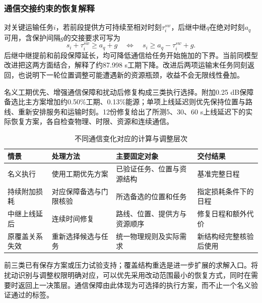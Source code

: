 \subsubsection{通信交接约束的恢复解释}
对关键运输任务$i$，若前段提供方可持续至相对时刻$\tau_i^{sw}$，后继中继$q$在绝对时刻$a_q$可用，含保护间隔$g$的交接要求可写为
\begin{equation}
 s_i+\tau_i^{sw}\ge a_q+g
 \quad\Longleftrightarrow\quad
 s_i\ge a_q-\tau_i^{sw}+g.
 \label{eq:q3_handoff_start}
\end{equation}
后继中继提前和前段保障延长，均可降低通信给任务开始施加的下界。当前同模型改进把这两方面结合，解释了约87.998 s工期下降。改进后两项运输末任务同刻返回，也说明下一轮位置调整可能遭遇新的资源瓶颈，收益不会无限线性叠加。

名义工期优先、增强通信保障和扰动后修复构成三类执行选择。附加0.25 dB保障备选比主方案增加约0.50\%工期、0.13\%能源；单项上线延迟则优先保持位置与路线、重新安排服务和运输时刻。12份修复给出了所测5、30、60 s上线延迟下的实际恢复方案，各自检查物理、时限、资源和连续通信。

\begin{table}[htbp]\centering\small
\caption{不同通信变化对应的计算与调整层次}\label{tab:q3_recovery_policy}
\begin{tabularx}{\linewidth}{p{2.3cm}LLL}\toprule
情景 & 处理方法 & 主要固定对象 & 交付结果\\\midrule
名义执行 & 使用工期优先方案 & 已验证任务、位置与资源结构 & 基准完整日程\\
持续附加损耗 & 对应保障备选与门限核验 & 所选备选的位置和任务 & 指定损耗条件下的日程\\
中继上线延后 & 连续时间修复 & 路线、位置、提供方与资源顺序 & 修复日程和额外代价\\
原覆盖关系失效 & 重新选择候选与任务 & 统一物理规则及实际需求 & 新结构经完整核验后使用\\\bottomrule
\end{tabularx}\end{table}

前三类已有保存方案或压力试验支持；覆盖结构重选是进一步扩展的求解入口。将扰动识别与调整权限明确对应，可以优先采用改动范围最小的恢复方式，同时在需要时返回上一决策层。通信保障由此体现为可选择的执行方案，而不止一个名义验证通过的标签。
